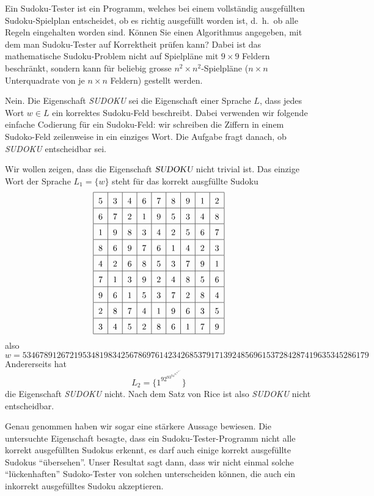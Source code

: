 Ein Sudoku-Tester ist ein Programm, welches bei einem vollständig
ausgefüllten Sudoku-Spielplan entscheidet, ob es richtig ausgefüllt
worden ist, d.~h.~ob alle Regeln eingehalten worden sind. Können Sie
einen Algorithmus angegeben, mit dem man Sudoku-Tester auf Korrektheit
prüfen kann? Dabei ist das mathematische Sudoku-Problem nicht auf
Spielpläne mit $9\times 9$ Feldern beschränkt,
sondern kann für beliebig grosse
$n^2\times n^2$-Spielpläne ($n\times n$ Unterquadrate von je $n\times n$
Feldern) gestellt werden.


\begin{loesung}
Nein.  Die Eigenschaft \textsl{SUDOKU} sei die Eigenschaft einer
Sprache $L$, dass jedes Wort $w\in L$ ein korrektes Sudoku-Feld
beschreibt. Dabei verwenden wir folgende einfache
Codierung für ein Sudoku-Feld: wir schreiben die Ziffern in
einem Sudoko-Feld zeilenweise in ein einziges Wort.
Die Aufgabe fragt danach, ob \textsl{SUDOKU} entscheidbar sei.

Wir wollen zeigen, dass die
Eigenschaft $\textsl{SUDOKU}$ nicht trivial ist.
Das einzige Wort der Sprache $L_1=\{w\}$  steht für das korrekt
ausgfüllte Sudoku
\[
\begin{tabular}{|c|c|c|c|c|c|c|c|c|}
\hline
\raisebox{0pt}[13pt][5pt]{5}&3&4&6&7&8&9&1&2\\
\hline
\raisebox{0pt}[13pt][5pt]{6}&7&2&1&9&5&3&4&8\\
\hline
\raisebox{0pt}[13pt][5pt]{1}&9&8&3&4&2&5&6&7\\
\hline
\raisebox{0pt}[13pt][5pt]{8}&6&9&7&6&1&4&2&3\\
\hline
\raisebox{0pt}[13pt][5pt]{4}&2&6&8&5&3&7&9&1\\
\hline
\raisebox{0pt}[13pt][5pt]{7}&1&3&9&2&4&8&5&6\\
\hline
\raisebox{0pt}[13pt][5pt]{9}&6&1&5&3&7&2&8&4\\
\hline
\raisebox{0pt}[13pt][5pt]{2}&8&7&4&1&9&6&3&5\\
\hline
\raisebox{0pt}[13pt][5pt]{3}&4&5&2&8&6&1&7&9\\
\hline
\end{tabular}
\]
also
\[
w=
534678912672195348198342567869761423426853791713924856961537284287419635345286179
\]
Andererseits hat
\[
L_2=\{1^92^93^94^95^96^97^98^99^9\}
\]
die Eigenschaft \textsl{SUDOKU} nicht. Nach dem Satz
von Rice ist also \textsl{SUDOKU} nicht entscheidbar.

Genau genommen haben wir sogar eine stärkere Aussage bewiesen.
Die untersuchte Eigenschaft besagte, dass ein Sudoku-Tester-Programm nicht
alle korrekt ausgefüllten Sudokus erkennt, es darf auch einige
korrekt ausgefüllte Sudokus ``übersehen''. Unser Resultat sagt dann,
dass wir nicht einmal solche ``lückenhaften'' Sudoko-Tester von solchen
unterscheiden können, die auch ein inkorrekt ausgefülltes Sudoku
akzeptieren.
\end{loesung}
